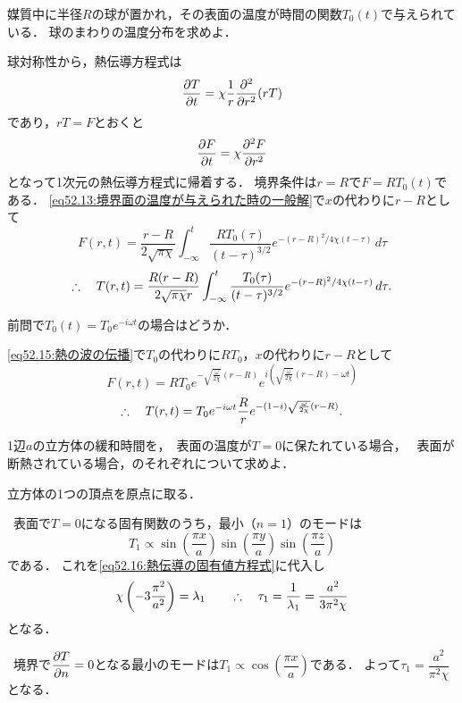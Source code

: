 \begin{mondai}{}{}
媒質中に半径$R$の球が置かれ，その表面の温度が時間の関数$T_0(t)$で与えられている．
球のまわりの温度分布を求めよ．
\end{mondai}
\begin{kaitou}
球対称性から，熱伝導方程式は
\[
    \pdv{T}{t} = \chi \frac{1}{r} \pdv[2]{r} (rT)
\]
であり，$rT=F$とおくと
\[
    \pdv{F}{t} = \chi \pdv[2]{F}{r}
\]
となって1次元の熱伝導方程式に帰着する．
境界条件は$r=R$で$F=RT_0(t)$である．
\eqref{eq52.13:境界面の温度が与えられた時の一般解}で$x$の代わりに$r-R$として
\[
    F(r, t) = \frac{r-R}{2\sqrt{\pi\chi}} \int_{-\infty}^{t} \frac{RT_0(\tau)}{(t-\tau)^{3/2}} e^{-(r-R)^2/4\chi (t-\tau)} \, d\tau
\]
\[
    \therefore\quad T(r, t) = \frac{R(r-R)}{2\sqrt{\pi\chi}r} \int_{-\infty}^{t} \frac{T_0(\tau)}{(t-\tau)^{3/2}} e^{-(r-R)^2/4\chi (t-\tau)} \, d\tau .
\]

\end{kaitou}





\begin{mondai}{}{}
前問で$T_0(t)=T_0 e^{-i\omega t}$の場合はどうか．
\end{mondai}
\begin{kaitou}
\eqref{eq52.15:熱の波の伝播}で$T_0$の代わりに$RT_0$，$x$の代わりに$r-R$として
\[
    F(r,t) = RT_0 e^{-\sqrt{\frac{\omega}{2\chi}}(r-R)} e^{ i \left(\sqrt{\frac{\omega}{2\chi}} (r-R) - \omega t \right)}
\]
\[
    \therefore\quad T(r,t) = T_0 e^{-i\omega t} \frac{R}{r} e^{ -(1-i)\sqrt{\frac{\omega}{2\chi}} (r-R) }.
\]

\end{kaitou}






\begin{mondai}{}{}
1辺$a$の立方体の緩和時間を，\, 表面の温度が$T=0$に保たれている場合，
\, 表面が断熱されている場合，のそれぞれについて求めよ．
\end{mondai}
\begin{kaitou}
立方体の1つの頂点を原点に取る．


\noindent{}\,
表面で$T=0$になる固有関数のうち，最小（$n=1$）のモードは
\[
    T_1 \propto \sin \left( \frac{\pi x}{a} \right) \sin \left( \frac{\pi y}{a} \right) \sin \left( \frac{\pi z}{a} \right)
\]
である．
これを\eqref{eq52.16:熱伝導の固有値方程式}に代入し
\[
    \chi \left( -3 \frac{\pi^2}{a^2} \right) = \lambda_1
    \qquad \therefore\quad \tau_1 = \frac{1}{\lambda_1} = \frac{a^2}{3\pi^2\chi}
\]
となる．


\noindent{}\,
境界で$\dpdv{T}{n}=0$となる最小のモードは$T_1 \propto \cos \left( \dfrac{\pi x}{a} \right)$である．
よって$\tau_1 = \dfrac{a^2}{\pi^2\chi}$となる．


\end{kaitou}






